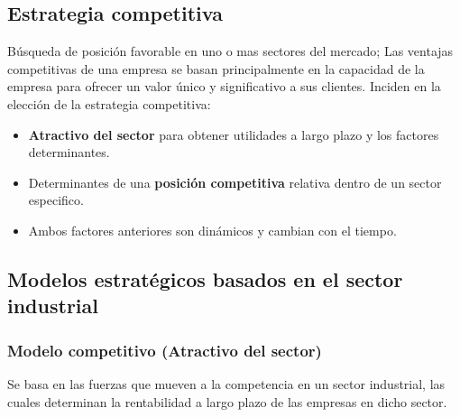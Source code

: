 \documentclass{templateNote}
\begin{document}
\subsection{Estrategia competitiva}
\noindent Búsqueda de posición favorable en uno o mas sectores del mercado; Las ventajas competitivas de una empresa se basan principalmente en la capacidad de la empresa para ofrecer un valor único y significativo a sus clientes. Inciden en la elección de la estrategia competitiva:
\begin{itemize}
    \item \textbf{Atractivo del sector} para obtener utilidades a largo plazo y los factores determinantes.
    
    \item Determinantes de una \textbf{posición competitiva} relativa dentro de un sector especifico.
    
    \item Ambos factores anteriores son dinámicos y cambian con el tiempo.
\end{itemize}

\subsection{Modelos estratégicos basados en el sector industrial}

\subsubsection{Modelo competitivo (Atractivo del sector)}
\noindent Se basa en las fuerzas que mueven a la competencia en un sector industrial, las cuales determinan la rentabilidad a largo plazo de las empresas en dicho sector.
\end{document}
